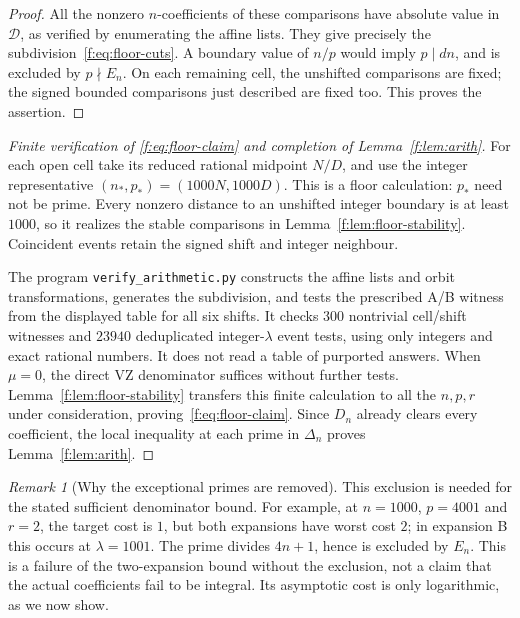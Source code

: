 \documentclass[11pt]{amsart}
\theoremstyle{plain}
\theoremstyle{remark}\newtheorem{remark}[theorem]{Remark}
\numberwithin{equation}{section}
\begin{document}
\begin{proof}
All the nonzero $n$-coefficients of these comparisons have absolute
value in $\mathcal D$, as verified by enumerating the affine lists.
They give precisely the subdivision~\eqref{f:eq:floor-cuts}.
A boundary value of $n/p$ would imply $p\mid dn$, and is excluded by
$p\nmid E_n$. On each remaining cell, the unshifted comparisons are
fixed; the signed bounded comparisons just described are fixed too.
This proves the assertion.
\end{proof}

\begin{proof}[Finite verification of \eqref{f:eq:floor-claim} and completion of Lemma~\ref{f:lem:arith}]
For each open cell take its reduced rational midpoint $N/D$, and use the
integer representative $(n_*,p_*)=(1000N,1000D)$.
This is a floor calculation: $p_*$ need not be prime. Every nonzero
distance to an unshifted integer boundary is at least $1000$, so it
realizes the stable comparisons in Lemma~\ref{f:lem:floor-stability}.
Coincident events retain the signed shift and integer neighbour.

The program \texttt{verify\_arithmetic.py} constructs the affine lists
and orbit transformations, generates the subdivision, and tests the
prescribed A/B witness from the displayed table for all six shifts.
It checks $300$ nontrivial cell/shift witnesses and $23940$ deduplicated
integer-$\lambda$ event tests, using only integers and exact rational
numbers. It does not read a table of purported answers. When $\mu=0$,
the direct VZ denominator suffices without further tests.
Lemma~\ref{f:lem:floor-stability} transfers this finite calculation to
all the $n,p,r$ under consideration, proving~\eqref{f:eq:floor-claim}.
Since $D_n$ already clears every coefficient, the local inequality at
each prime in $\Delta_n$ proves Lemma~\ref{f:lem:arith}.
\end{proof}

\begin{remark}[Why the exceptional primes are removed]
This exclusion is needed for the stated sufficient denominator bound.
For example, at $n=1000$, $p=4001$ and $r=2$, the target cost is $1$,
but both expansions have worst cost $2$; in expansion B this occurs at
$\lambda=1001$. The prime divides $4n+1$, hence is excluded by $E_n$.
This is a failure of the two-expansion bound without the exclusion, not
a claim that the actual coefficients fail to be integral. Its
asymptotic cost is only logarithmic, as we now show.
\end{remark}
\end{document}
